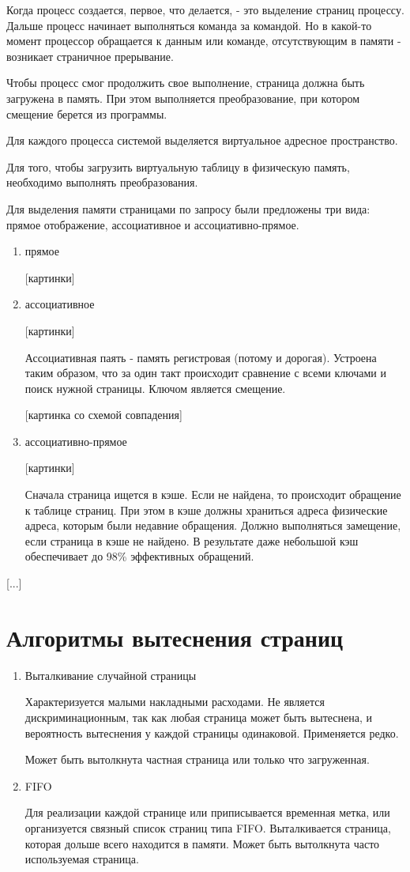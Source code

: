 \documentclass[a4paper, 14pt]{extreport}
\begin{document}
	Когда процесс создается, первое, что делается, - это выделение страниц процессу. Дальше процесс начинает выполняться команда за командой. Но в какой-то момент процессор обращается к данным или команде, отсутствующим в памяти - возникает страничное прерывание.
	
	Чтобы процесс смог продолжить свое выполнение, страница должна быть загружена в память. При этом выполняется преобразование, при котором смещение берется из программы.
	
	Для каждого процесса системой выделяется виртуальное адресное пространство.
	
	Для того, чтобы загрузить виртуальную таблицу в физическую память, необходимо выполнять преобразования.
	
	Для выделения памяти страницами по запросу были предложены три вида: прямое отображение, ассоциативное и ассоциативно-прямое.
	
	\begin{enumerate}
		\item прямое
		
		[картинки]
		\item ассоциативное
		
		[картинки]
		
		Ассоциативная паять - память регистровая (потому и дорогая). Устроена таким образом, что за один такт происходит сравнение с всеми ключами и поиск нужной страницы. Ключом является смещение.
		
		[картинка со схемой совпадения]
		\item ассоциативно-прямое
		
		[картинки]
		
		Сначала страница ищется в кэше. Если не найдена, то происходит обращение к таблице страниц. При этом в кэше должны храниться адреса физические адреса, которым были недавние обращения. Должно выполняться замещение, если страница в кэше не найдено. В результате даже небольшой кэш обеспечивает до 98\% эффективных обращений.
	\end{enumerate}

	[...]
	
	\section{Алгоритмы вытеснения страниц}
	
	\begin{enumerate}
		\item Выталкивание случайной страницы
		
		Характеризуется малыми накладными расходами. Не является дискриминационным, так как любая страница может быть вытеснена, и вероятность вытеснения у каждой страницы одинаковой. Применяется редко.
		
		Может быть вытолкнута частная страница или только что загруженная.
		
		\item FIFO
		
		Для реализации каждой странице или приписывается временная метка, или организуется связный список страниц типа FIFO. Выталкивается страница, которая дольше всего находится в памяти. Может быть вытолкнута часто используемая страница.
	\end{enumerate}
\end{document}

